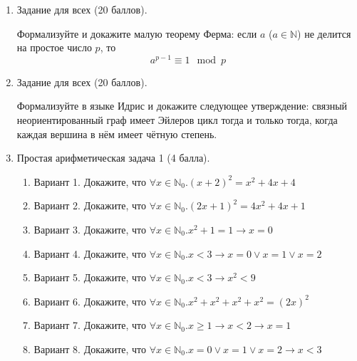 \documentclass[10pt,a4paper,oneside]{article}
\begin{document}
\begin{enumerate}
\item Задание для всех (20 баллов).

Формализуйте и докажите малую теорему Ферма: если $a$ ($a \in \mathbb{N}$) не делится на простое число $p$,
то $$a^{p-1} \equiv 1 \mod p$$

\item Задание для всех (20 баллов).

Формализуйте в языке Идрис и докажите следующее утверждение: связный неориентированный
граф имеет Эйлеров цикл тогда и только тогда, когда каждая вершина в нём имеет чётную степень.

\item Простая арифметическая задача 1 (4 балла).
\begin{enumerate}
\item Вариант 1.
Докажите, что $\forall x\in\mathbb{N}_0.(x+2)^2 = x^2 + 4x + 4$
\item Вариант 2.
Докажите, что $\forall x\in\mathbb{N}_0.(2x+1)^2 = 4x^2 + 4x + 1$
\item Вариант 3.
Докажите, что $\forall x\in\mathbb{N}_0.x^2 + 1 = 1 \rightarrow x = 0$
\item Вариант 4.
Докажите, что $\forall x\in\mathbb{N}_0.x < 3 \rightarrow x = 0 \vee x = 1 \vee x = 2$
\item Вариант 5.
Докажите, что $\forall x\in\mathbb{N}_0.x < 3 \rightarrow x^2 < 9$
\item Вариант 6.
Докажите, что $\forall x\in\mathbb{N}_0.x^2 + x^2 + x^2 + x^2 = (2x)^2$
\item Вариант 7.
Докажите, что $\forall x\in\mathbb{N}_0.x \ge 1 \rightarrow x < 2 \rightarrow x = 1$
\item Вариант 8.
Докажите, что $\forall x\in\mathbb{N}_0.x = 0 \vee x = 1 \vee x = 2 \rightarrow x < 3$
\end{enumerate}


\end{enumerate}
\end{document}
